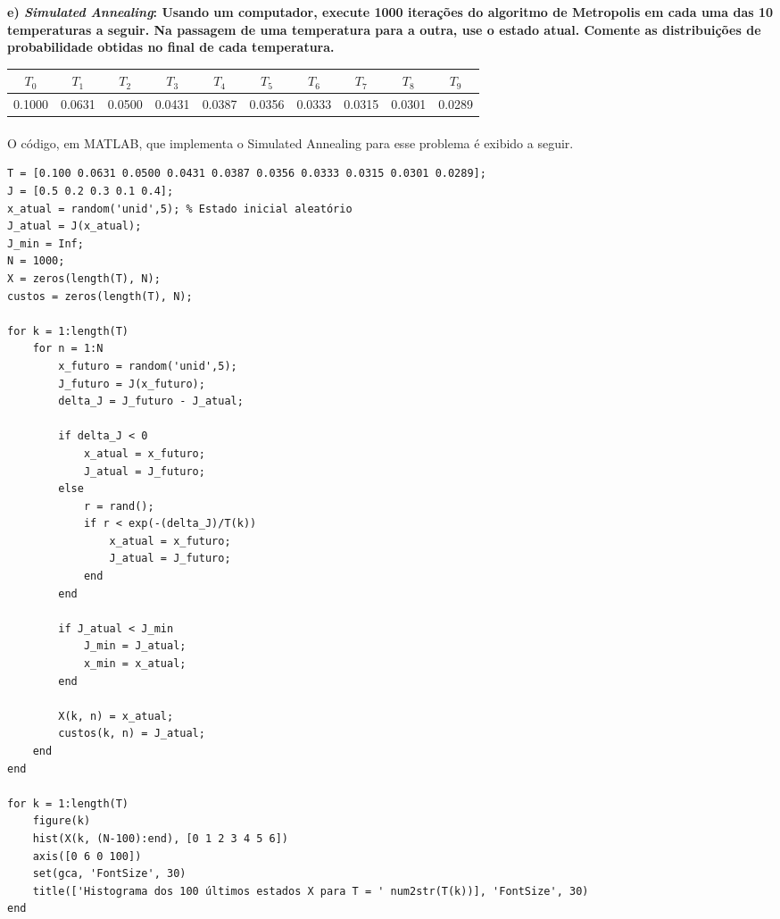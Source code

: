 \documentclass{report}
\begin{document}
\textbf{e) \textit{Simulated Annealing}: Usando um computador, execute 1000 iterações do algoritmo de Metropolis em cada uma das 10 temperaturas a seguir. Na passagem de uma temperatura para a outra, use o estado atual. Comente as distribuições de probabilidade obtidas no final de cada temperatura.}\\

\begin{table}[H]
	\centering
	\begin{tabular}{c|c|c|c|c|c|c|c|c|c}
	$T_0$ & $T_1$ & $T_2$ & $T_3$ & $T_4$ & $T_5$ & $T_6$ & $T_7$ & $T_8$ & $T_9$ \\ 
	\hline 
	0.1000 & 0.0631 & 0.0500 & 0.0431 & 0.0387 & 0.0356 & 0.0333 & 0.0315 & 0.0301 & 0.0289 \\ 
\end{tabular} 
\end{table}

\paragraph{} O código, em MATLAB, que implementa o Simulated Annealing para esse problema é exibido a seguir.\\

\begin{lstlisting}
T = [0.100 0.0631 0.0500 0.0431 0.0387 0.0356 0.0333 0.0315 0.0301 0.0289];
J = [0.5 0.2 0.3 0.1 0.4];
x_atual = random('unid',5); % Estado inicial aleatório
J_atual = J(x_atual);
J_min = Inf;
N = 1000;
X = zeros(length(T), N);
custos = zeros(length(T), N);

for k = 1:length(T)
    for n = 1:N
        x_futuro = random('unid',5);
        J_futuro = J(x_futuro);
        delta_J = J_futuro - J_atual;

        if delta_J < 0
            x_atual = x_futuro;
            J_atual = J_futuro;
        else
            r = rand();
            if r < exp(-(delta_J)/T(k))
                x_atual = x_futuro;
                J_atual = J_futuro;
            end
        end

        if J_atual < J_min
            J_min = J_atual;
            x_min = x_atual;
        end
        
        X(k, n) = x_atual;
        custos(k, n) = J_atual;
    end
end

for k = 1:length(T)
    figure(k)
    hist(X(k, (N-100):end), [0 1 2 3 4 5 6])
    axis([0 6 0 100])
    set(gca, 'FontSize', 30)
    title(['Histograma dos 100 últimos estados X para T = ' num2str(T(k))], 'FontSize', 30)
end
\end{lstlisting}
\end{document}
